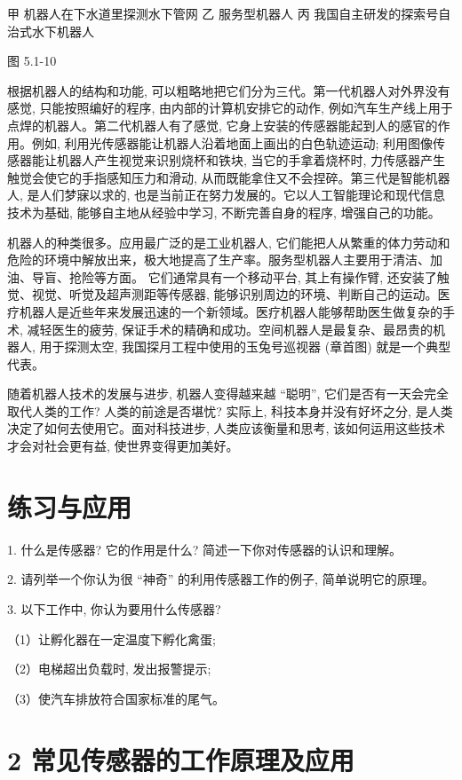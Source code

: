 \documentclass[10pt]{article}
\begin{document}
甲 机器人在下水道里探测水下管网 乙 服务型机器人 丙 我国自主研发的探索号自治式水下机器人

图 5.1-10

根据机器人的结构和功能, 可以粗略地把它们分为三代。第一代机器人对外界没有感觉, 只能按照编好的程序, 由内部的计算机安排它的动作, 例如汽车生产线上用于点焊的机器人。第二代机器人有了感觉, 它身上安装的传感器能起到人的感官的作用。例如, 利用光传感器能让机器人沿着地面上画出的白色轨迹运动; 利用图像传感器能让机器人产生视觉来识别烧杯和铁块, 当它的手拿着烧杯时, 力传感器产生触觉会使它的手指感知压力和滑动, 从而既能拿住又不会捏碎。第三代是智能机器人, 是人们梦寐以求的, 也是当前正在努力发展的。它以人工智能理论和现代信息技术为基础, 能够自主地从经验中学习, 不断完善自身的程序, 增强自己的功能。

机器人的种类很多。应用最广泛的是工业机器人, 它们能把人从繁重的体力劳动和危险的环境中解放出来，极大地提高了生产率。服务型机器人主要用于清洁、加油、导盲、抢险等方面。 它们通常具有一个移动平台, 其上有操作臂, 还安装了触觉、视觉、听觉及超声测距等传感器, 能够识别周边的环境、判断自己的运动。医疗机器人是近些年来发展迅速的一个新领域。医疗机器人能够帮助医生做复杂的手术, 减轻医生的疲劳, 保证手术的精确和成功。空间机器人是最复杂、最昂贵的机器人, 用于探测太空, 我国探月工程中使用的玉兔号巡视器 (章首图) 就是一个典型代表。

随着机器人技术的发展与进步, 机器人变得越来越 “聪明”, 它们是否有一天会完全取代人类的工作? 人类的前途是否堪忧? 实际上, 科技本身并没有好坏之分, 是人类决定了如何去使用它。面对科技进步, 人类应该衡量和思考, 该如何运用这些技术才会对社会更有益, 使世界变得更加美好。

\section*{练习与应用}

1. 什么是传感器? 它的作用是什么? 简述一下你对传感器的认识和理解。

2. 请列举一个你认为很 “神奇” 的利用传感器工作的例子, 简单说明它的原理。

3. 以下工作中, 你认为要用什么传感器?

（1）让孵化器在一定温度下孵化禽蛋;

（2）电梯超出负载时, 发出报警提示;

（3）使汽车排放符合国家标准的尾气。

\section*{2 常见传感器的工作原理及应用}
\end{document}
